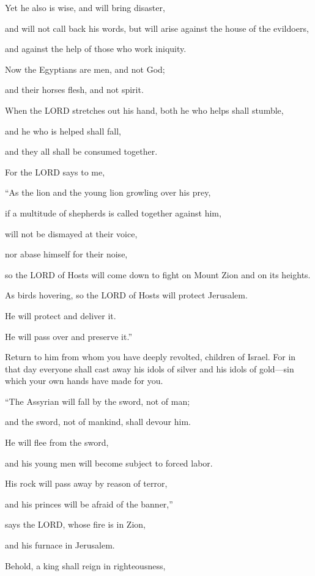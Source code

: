 \myverse{}Yet he also is wise, and will bring disaster,

and will not call back his words, but will arise against the house of the evildoers,

and against the help of those who work iniquity.

\myverse{}Now the Egyptians are men, and not God;

and their horses flesh, and not spirit.

When the LORD stretches out his hand, both he who helps shall stumble,

and he who is helped shall fall,

and they all shall be consumed together.


\vspace{\baselineskip} \myverse{}For the LORD says to me,

“As the lion and the young lion growling over his prey,

if a multitude of shepherds is called together against him,

will not be dismayed at their voice,

nor abase himself for their noise,

so the LORD of Hosts will come down to fight on Mount Zion and on its heights.

\myverse{}As birds hovering, so the LORD of Hosts will protect Jerusalem.

He will protect and deliver it.

He will pass over and preserve it.”

\myverse{}Return to him from whom you have deeply revolted, children of
Israel.
\myverse{}For in that day everyone shall cast away his idols of silver and his idols
of gold—sin which your own hands have made for you.

\myverse{}“The Assyrian will fall by the sword, not of man;

and the sword, not of mankind, shall devour him.

He will flee from the sword,

and his young men will become subject to forced labor.

\myverse{}His rock will pass away by reason of terror,

and his princes will be afraid of the banner,”

says the LORD, whose fire is in Zion,

and his furnace in Jerusalem.


\mychapter{} \myverse*{}Behold, a king shall reign in righteousness,

